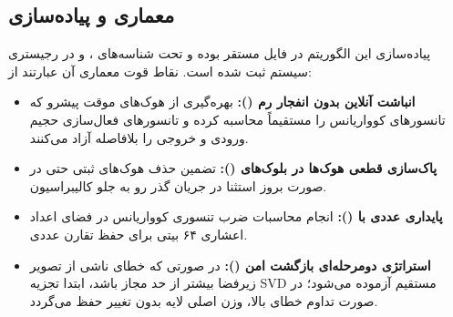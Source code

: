 \subsection{معماری و پیاده‌سازی}
پیاده‌سازی این الگوریتم در فایل  مستقر بوده و تحت شناسه‌های ،  و  در رجیستری سیستم ثبت شده است. نقاط قوت معماری آن عبارتند از:
\begin{itemize}
    \item \textbf{انباشت آنلاین بدون انفجار رم ():} بهره‌گیری از هوک‌های موقت پیشرو که تانسورهای کوواریانس را مستقیماً محاسبه کرده و تانسورهای فعال‌سازی حجیم ورودی و خروجی را بلافاصله آزاد می‌کنند.
    \item \textbf{پاک‌سازی قطعی هوک‌ها در بلوک‌های  ():} تضمین حذف هوک‌های ثبتی حتی در صورت بروز استثنا در جریان گذر رو به جلو کالیبراسیون.
    \item \textbf{پایداری عددی با  ():} انجام محاسبات ضرب تنسوری کوواریانس در فضای اعداد اعشاری ۶۴ بیتی برای حفظ تقارن عددی.
    \item \textbf{استراتژی دومرحله‌ای بازگشت امن ():} در صورتی که خطای ناشی از تصویر زیرفضا بیشتر از حد مجاز باشد، ابتدا تجزیه SVD مستقیم آزموده می‌شود؛ در صورت تداوم خطای بالا، وزن اصلی لایه بدون تغییر حفظ می‌گردد.
\end{itemize}
